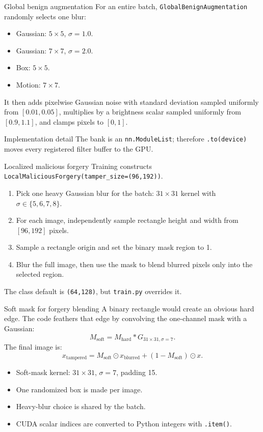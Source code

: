 \documentclass[aspectratio=169,10pt]{beamer}
\newcommand{\file}[1]{\texttt{#1}}
\newcommand{\code}[1]{\texttt{#1}}
\begin{document}
\begin{frame}{Global benign augmentation}
  For an entire batch, \code{GlobalBenignAugmentation} randomly selects one blur:
  \begin{itemize}
    \item Gaussian: $5\times5$, $\sigma=1.0$.
    \item Gaussian: $7\times7$, $\sigma=2.0$.
    \item Box: $5\times5$.
    \item Motion: $7\times7$.
  \end{itemize}
  It then adds pixelwise Gaussian noise with standard deviation sampled uniformly
  from $[0.01,0.05]$, multiplies by a brightness scalar sampled uniformly from
  $[0.9,1.1]$, and clamps pixels to $[0,1]$.
  \begin{block}{Implementation detail}
    The bank is an \code{nn.ModuleList}; therefore \code{.to(device)} moves every
    registered filter buffer to the GPU.
  \end{block}
\end{frame}

\begin{frame}{Localized malicious forgery}
  Training constructs \code{LocalMaliciousForgery(tamper\_size=(96,192))}.
  \begin{enumerate}
    \item Pick one heavy Gaussian blur for the batch: $31\times31$ kernel with
          $\sigma\in\{5,6,7,8\}$.
    \item For each image, independently sample rectangle height and width from
          $[96,192]$ pixels.
    \item Sample a rectangle origin and set the binary mask region to 1.
    \item Blur the full image, then use the mask to blend blurred pixels only
          into the selected region.
  \end{enumerate}
  The class default is \code{(64,128)}, but \file{train.py} overrides it.
\end{frame}

\begin{frame}{Soft mask for forgery blending}
  A binary rectangle would create an obvious hard edge. The code feathers that
  edge by convolving the one-channel mask with a Gaussian:
  \[
    M_{\mathrm{soft}} = M_{\mathrm{hard}} * G_{31\times31,\sigma=7}.
  \]
  The final image is:
  \[
    x_{\mathrm{tampered}} =
    M_{\mathrm{soft}}\odot x_{\mathrm{blurred}} +
    (1-M_{\mathrm{soft}})\odot x.
  \]
  \begin{itemize}
    \item Soft-mask kernel: $31\times31$, $\sigma=7$, padding 15.
    \item One randomized box is made per image.
    \item Heavy-blur choice is shared by the batch.
    \item CUDA scalar indices are converted to Python integers with \code{.item()}.
  \end{itemize}
\end{frame}
\end{document}
